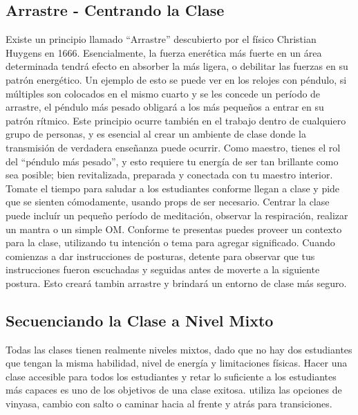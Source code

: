 \subsection{Arrastre - Centrando la Clase}
Existe un principio llamado ``Arrastre'' descubierto por el físico Christian Huygens en 1666. Esencialmente, la fuerza ener\'etica más fuerte en un área determinada tendrá efecto en absorber la más ligera, o debilitar las fuerzas en su patrón energ\'etico. Un ejemplo de esto se puede ver en los relojes con p\'endulo, si múltiples son colocados en el mismo cuarto y se les concede un período de arrastre, el p\'endulo más pesado obligará a los más pequeños a entrar en su patrón rítmico. Este principio ocurre tambi\'en en el trabajo dentro de cualquiero grupo de personas, y es esencial al crear un ambiente de clase donde la transmisión de verdadera enseñanza puede ocurrir. Como maestro, tienes el rol del ``p\'endulo más pesado'', y esto requiere tu energía de ser tan brillante como sea posible; bien revitalizada, preparada y conectada con tu maestro interior. Tomate el tiempo para saludar a los estudiantes conforme llegan a clase y pide que se sienten cómodamente, usando props de ser necesario. Centrar la clase puede incluír un pequeño período de meditación, observar la respiración, realizar un mantra o un simple OM. Conforme te presentas puedes proveer un contexto para la clase, utilizando tu intención o tema para agregar significado. Cuando comienzas a dar instrucciones de posturas, detente para observar que tus instrucciones fueron escuchadas y seguidas antes de moverte a la siguiente postura. Esto creará tambin arrastre y brindará un entorno de clase más seguro.

\subsection{Secuenciando la Clase a Nivel Mixto}
Todas las clases tienen realmente niveles mixtos, dado que no hay dos estudiantes que tengan la misma habilidad, nivel de energía y limitaciones físicas. Hacer una clase accesible para todos los estudiantes y retar lo suficiente a los estudiantes más capaces es uno de los objetivos de una clase exitosa. utiliza las opciones de vinyasa, cambio con salto o caminar hacia al frente y atrás para transiciones.

